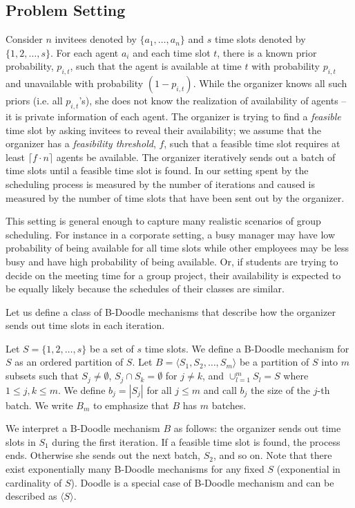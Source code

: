 \subsection{Problem Setting}
Consider $n$ invitees denoted by $\{a_1, \dots, a_n\}$ and $s$ time slots denoted by $\{1, 2, \dots, s\}$.
For each agent $a_i$ and each time slot $t$, there is a known prior probability, $p_{i, t}$, such that the agent is available at time $t$ with probability $p_{i, t}$ and unavailable with probability $(1-p_{i, t})$. 
While the organizer knows all such priors (i.e. all $p_{i,t}$'s), she does not know the realization of availability of agents -- it is private information of each agent.
The organizer is trying to find a \emph{feasible} time slot by asking invitees to reveal their availability; we assume that the organizer has a \emph{feasibility threshold}, $f$, such that a feasible time slot requires at least $\lceil f \cdot n \rceil$ agents be available. The organizer iteratively sends out a batch of time slots until a feasible time slot is found. In our setting \Times spent by the scheduling process is measured by the number of iterations and \Inconveniences caused is measured by the number of time slots that have been sent out by the organizer.

This setting is general enough to capture many realistic scenarios of group scheduling. For instance in a corporate setting, a busy manager may have low probability of being available for all time slots while other employees may be less busy and have high probability of being available. Or, if students are trying to decide on the meeting time for a group project, their availability is expected to be equally likely because the schedules of their classes are similar.

Let us define a class of B-Doodle mechanisms that describe how the organizer sends out time slots in each iteration.
\begin{definition}
Let $S = \{1, 2, \dots, s\}$ be a set of $s$ time slots. We define a B-Doodle mechanism for $S$ as an ordered partition of $S$.
Let $B = \langle S_1, S_2, \dots, S_m \rangle$ be a partition of $S$ into $m$ subsets such that $S_j \neq\emptyset$, $S_j \cap S_k = \emptyset$ for $j \neq k$, and $\cup_{l=1}^{m} S_l = S$ where $1 \leq j,k \leq m$. We define $b_j = |S_j|$ for all $j \leq m$ and call $b_j$ the size of the $j$-th batch. 
We write $B_m$ to emphasize that $B$ has $m$ batches.
\end{definition}
We interpret a B-Doodle mechanism $B$ as follows: the organizer sends out time slots in $S_1$ during the first iteration. If a feasible time slot is found, the process ends. Otherwise she sends out the next batch, $S_2$, and so on.
Note that there exist exponentially many B-Doodle mechanisms for any fixed $S$ (exponential in cardinality of $S$). 
Doodle is a special case of B-Doodle mechanism and can be described as $\langle S \rangle$.

